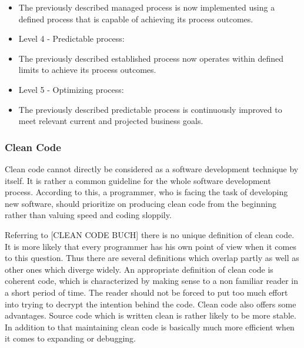 \begin{itemize}
\tightlist
\item
  {The previously described managed process is now implemented using a
  defined process that is capable of achieving its process outcomes.}
\end{itemize}

\begin{itemize}
\tightlist
\item
  {Level 4 - Predictable process:}
\end{itemize}

\begin{itemize}
\tightlist
\item
  {The previously described established process now operates within
  defined limits to achieve its process outcomes.}
\end{itemize}

\begin{itemize}
\tightlist
\item
  {Level 5 - Optimizing process:}
\end{itemize}

\begin{itemize}
\tightlist
\item
  {The previously described predictable process is continuously improved
  to meet relevant current and projected business goals.}
\end{itemize}

\hypertarget{h.mifm7q3zf07v}{\subsubsection{\texorpdfstring{{Clean
Code}}{Clean Code}}\label{h.mifm7q3zf07v}}

{Clean code cannot directly be considered as a software development
technique by itself. It is rather a common guideline for the whole
software development process. According to this, a programmer, who is
facing the task of developing new software, should prioritize on
producing clean code from the beginning rather than valuing speed and
coding sloppily.}

{Referring to {[}CLEAN CODE BUCH{]} there is no unique definition of
clean code. It is more likely that every programmer has his own point of
view when it comes to this question. Thus there are several definitions
which overlap partly as well as other ones which diverge widely. An
appropriate definition of clean code is coherent code, which is
characterized by making sense to a non familiar reader in a short period
of time. The reader should not be forced to put too much effort into
trying to decrypt the intention behind the code. Clean code also offers
some advantages. Source code which is written clean is rather likely to
be more stable. In addition to that maintaining clean code is basically
much more efficient when it comes to expanding or debugging.}

